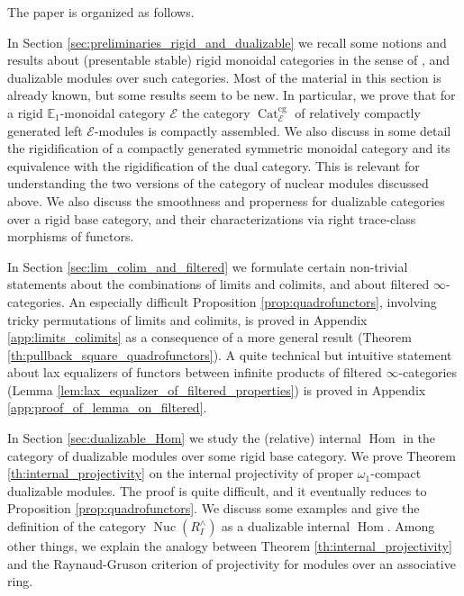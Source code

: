 \documentclass[11pt,leqno]{amsart}
\numberwithin{equation}{section}
\def\Hom{\operatorname{Hom}}
\newcommand{\Nuc}{\operatorname{Nuc}}
\newcommand{\Cat}{\operatorname{Cat}}
\newcommand{\cg}{\operatorname{cg}}
\newcommand{\bE}{{\mathbb E}}
\newcommand{\cE}{{\mathcal E}}
\begin{document}
The paper is organized as follows.

In Section \ref{sec:preliminaries_rigid_and_dualizable} we recall some notions and results about (presentable stable) rigid monoidal categories in the sense of \cite[Definition 9.1.2]{GaRo17}, and dualizable modules over such categories. Most of the material in this section is already known, but some results seem to be new. In particular, we prove that for a rigid $\bE_1$-monoidal category $\cE$ the category $\Cat_{\cE}^{\cg}$ of relatively compactly generated left $\cE$-modules is compactly assembled. We also discuss in some detail the rigidification of a compactly generated symmetric monoidal category and its equivalence with the rigidification of the dual category. This is relevant for understanding the two versions of the category of nuclear modules discussed above. We also discuss the smoothness and properness for dualizable categories over a rigid base category, and their characterizations via right trace-class morphisms of functors.

In Section \ref{sec:lim_colim_and_filtered} we formulate certain non-trivial statements about the combinations of limits and colimits, and about filtered $\infty$-categories. An especially difficult Proposition \ref{prop:quadrofunctors}, involving tricky permutations of limits and colimits, is proved in Appendix \ref{app:limits_colimits} as a consequence of a more general result (Theorem \ref{th:pullback_square_quadrofunctors}).  A quite technical but intuitive statement about lax equalizers of functors between infinite products of filtered $\infty$-categories (Lemma \ref{lem:lax_equalizer_of_filtered_properties}) is proved in Appendix \ref{app:proof_of_lemma_on_filtered}.

In Section \ref{sec:dualizable_Hom} we study the (relative) internal $\Hom$ in the category of dualizable modules over some rigid base category. We prove Theorem \ref{th:internal_projectivity} on the internal projectivity of proper $\omega_1$-compact dualizable modules. The proof is quite difficult, and it eventually reduces to Proposition \ref{prop:quadrofunctors}. We discuss some examples and give the definition of the category $\Nuc(R^{\wedge}_I)$ as a dualizable internal $\Hom.$ Among other things, we explain the analogy between Theorem \ref{th:internal_projectivity} and the Raynaud-Gruson criterion of projectivity for modules over an associative ring. 
\end{document}
